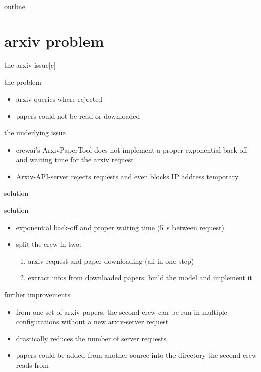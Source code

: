 \documentclass[t,
handout,
]{beamer}
\title{\topicName}
\subtitle{update, Arxiv and units}
\date{\today}
\author{\authorName}
\numberwithin{equation}{section}
\begin{document}
	\begin{frame}
		\titlepage
	\end{frame}
	
	\begin{frame}{outline}
		\tableofcontents
	\end{frame}
	
	\section{arxiv problem}
	\begin{frame}{the arxiv issue}[c]
		\begin{alertblock}{the problem}
			\begin{itemize}
				\item arxiv queries where rejected
				\item papers could not be read or downloaded
			\end{itemize}
		\end{alertblock}
		\begin{block}{the underlying issue}
			\begin{itemize}
				\item crewai's ArxivPaperTool does not implement a proper exponential back-off and waiting time for the arxiv request
				\item[$\implies$] Arxiv-API-server rejects requests and even blocks IP address temporary
			\end{itemize}
		\end{block}
	\end{frame}
		
	\begin{frame}{solution}
		\begin{exampleblock}{solution}
			\begin{itemize}
				\item exponential back-off and proper waiting time (\si{5 \second} between request)
				\item split the crew in two:
				\begin{enumerate}
					\item arxiv request and paper downloading (all in one step)
					\item extract infos from downloaded papers; build the model and 	implement it
				\end{enumerate}
			\end{itemize}
		\end{exampleblock}
		
		\begin{block}{further improvements}
			\begin{itemize}
				\item from one set of arxiv papers, the second crew can be run in multiple configurations without a new arxiv-server request
				\item[$\implies$] drastically reduces the number of server requests
				\item[$\implies$] papers could be added from another source into the directory the second crew reads from
			\end{itemize}
		\end{block}
	\end{frame}
	
\end{document}
